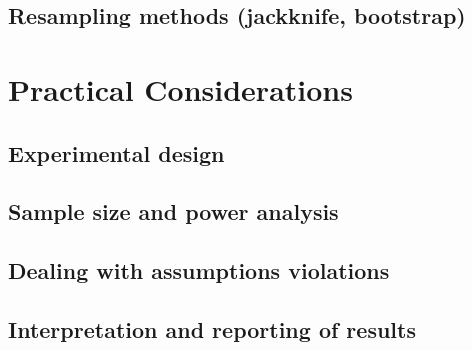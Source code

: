\documentclass{article}
\begin{document}
  \subsection{Resampling methods (jackknife, bootstrap)}

\section{Practical Considerations}

  \subsection{Experimental design}

  \subsection{Sample size and power analysis}

  \subsection{Dealing with assumptions violations}

  \subsection{Interpretation and reporting of results}
\end{document}
